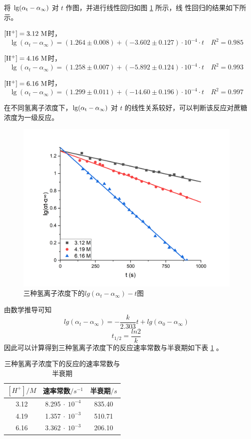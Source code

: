 \documentclass[cn,hazy,pku,12pt,normal,math=newtx,cite=super]{elegantnote}
\begin{document}
将 $\rm \lg(\alpha_t - \alpha_\infty)$ 对 $t$ 作图，并进行线性回归如图 \ref{8} 所示，线
性回归的结果如下所示。

$\rm [H^+] = 3.12\ M$时，
$$
\lg(\alpha_t - \alpha_\infty) = (1.264 \pm  0.008) + (-3.602 \pm  0.127) \cdot  10^{-4} \cdot  t \quad R^2=0.985	
$$

$\rm [H^+] = 4.16\ M$时，
$$
\lg(\alpha_t - \alpha_\infty) = (1.258 \pm  0.007) + (-5.892 \pm  0.124) \cdot  10^{-4} \cdot  t \quad R^2=0.993
$$

$\rm [H^+] = 6.16\ M$时，
$$
\lg(\alpha_t - \alpha_\infty) = (1.299 \pm  0.011) + (-14.60 \pm  0.196) \cdot  10^{-4} \cdot  t \quad R^2=0.997	
$$

在不同氢离子浓度下，$\rm \lg(\alpha_t - \alpha_\infty)$ 对 $t$ 的线性关系较好，可以判断该反应对蔗糖浓度为一级反应。
\begin{figure}[htbp]
    \centering
    \includegraphics[width = .70\textwidth]{image/Graph6.png}
    \caption{ 三种氢离子浓度下的$lg(\alpha_t - \alpha_\infty) - t $图}\label{8}
\end{figure}

由数学推导可知
$$
lg(\alpha_t - \alpha_\infty) = -\frac{k}{2.303}t + lg(\alpha_0 - \alpha_\infty)
$$
$$
t_{1/2} = \frac{ln2}{k}
$$
因此可以计算得到三种氢离子浓度下的反应速率常数与半衰期如下表 \ref{10} 。

\begin{table}[h]
    \centering
    \caption{三种氢离子浓度下的反应的速率常数与半衰期}
    \label{10}
    \begin{tabular}{ccc}\hline
    $[H^+]/M$& 速率常数$ / s^{-1}$ & 半衰期$/s$ \\ \hline
    3.12                         & 8.295$\ \cdot\ 10^{-4}$                  & 835.40 \\
    4.19                         & 1.357$\ \cdot\ 10^{-3}$               & 510.71 \\
    6.16                         & 3.362$\ \cdot\ 10^{-3}$                & 206.10 \\\hline
    \end{tabular}
\end{table}
\end{document}
